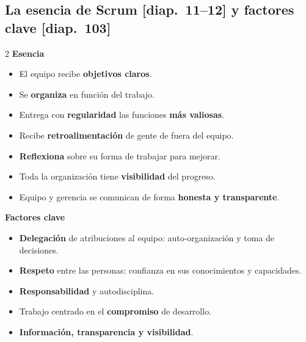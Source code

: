 \documentclass[11pt,a4paper,oneside,openany]{report}
\newcommand{\diap}[1]{\textcolor{mdaPrimary}{\small[diap.~#1]}}
\begin{document}
\subsection{La esencia de Scrum \diap{11--12} y factores clave \diap{103}}
\begin{multicols}{2}\small
\textbf{Esencia}
\begin{itemize}[leftmargin=*,itemsep=1pt]
  \item El equipo recibe \textbf{objetivos claros}.
  \item Se \textbf{organiza} en función del trabajo.
  \item Entrega con \textbf{regularidad} las funciones \textbf{más valiosas}.
  \item Recibe \textbf{retroalimentación} de gente de fuera del equipo.
  \item \textbf{Reflexiona} sobre su forma de trabajar para mejorar.
  \item Toda la organización tiene \textbf{visibilidad} del progreso.
  \item Equipo y gerencia se comunican de forma \textbf{honesta y transparente}.
\end{itemize}
\columnbreak
\textbf{Factores clave}
\begin{itemize}[leftmargin=*,itemsep=1pt]
  \item \textbf{Delegación} de atribuciones al equipo: auto-organización y toma de decisiones.
  \item \textbf{Respeto} entre las personas: confianza en sus conocimientos y capacidades.
  \item \textbf{Responsabilidad} y autodisciplina.
  \item Trabajo centrado en el \textbf{compromiso} de desarrollo.
  \item \textbf{Información, transparencia y visibilidad}.
\end{itemize}
\end{multicols}

\end{document}
